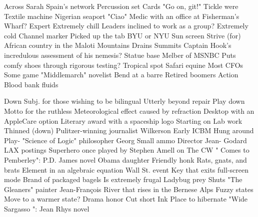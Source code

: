 \begin{clues}{Across}
     Sarah Spain's network
     Percussion set
     Cards
     "Go on, git!"
     Tickle
     {\blank} were
     Textile machine
     Nigerian seaport
     "Ciao"
     Medic with an office at Fisherman's Wharf?
     Expert
     Extremely chill
     Leaders inclined to work as a group?
     Extremely cold
     Channel marker
     Picked up the tab
     BYU or NYU
     Sun screen
     Strive (for)
     African country in the Maloti Mountains
     Drains
     Summits
     Captain Hook's incredulous assessment of his nemesis?
     Statue base
     Melber of MSNBC
     Puts comfy shoes through rigorous testing?
     Tropical spot
     Safari equine
     Most CFOs
     Some game
     "Middlemarch" novelist
     Bend at a barre
     Retired boomers
     Action
     Blood bank fluids
\end{clues}
\vspace{\cluesep}
\begin{clues}{Down}
     Subj. for those wishing to be bilingual
     Utterly beyond repair
     Play down
     Motto for the ruthless
     Meteorological effect caused by refraction
     Desktop with an AppleCare option
     Literary award with a spaceship logo
     Starting on
     Lab work
     Thinned (down)
     Pulitzer-winning journalist Wilkerson
     Early ICBM
     Hung around
     Play-{\blank}
     "Science of Logic" philosopher Georg
     Small ammo
     Director Jean-{\blank} Godard
     LAX postings
     Superhero once played by Stephen Amell on The CW
     "{\blank} Comes to Pemberley": P.D. James novel
     Obama daughter
     Friendly honk
     Rats, gnats, and brats
     Element in an algebraic equation
     Wall St. event
     Key that exits full-screen mode
     Brand of packaged bagels
     Is extremely frugal
     Ladybug prey
     Shuts
     "The Gleaners" painter Jean-François
     River that rises in the Bernese Alps
     Fuzzy states
     Move to a warmer state?
     Drama honor
     Cut short
     Ink
     Place to hibernate
     "Wide Sargasso {\blank}": Jean Rhys novel
\end{clues}
